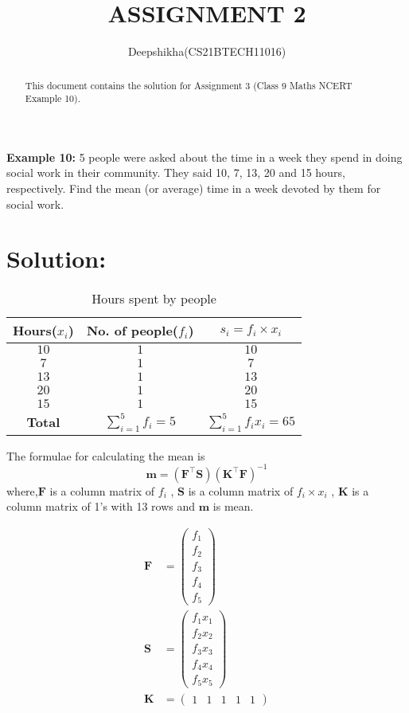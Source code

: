 \documentclass[journal, 12pt, twocolumn]{IEEEtran}
\let\vec\mathbf
\newcommand{\myvec}[1]{\ensuremath{\begin{pmatrix}#1\end{pmatrix}}}
\providecommand{\brak}[1]{\ensuremath{\left(#1\right)}}
\begin{document}
\title{ASSIGNMENT 2}
\author{Deepshikha(CS21BTECH11016)}
\maketitle

\begin{abstract}
This document contains the solution for Assignment 3 (Class 9 Maths NCERT Example 10).
\end{abstract}

\textbf{Example 10:}
5 people were asked about the time in a week they spend in doing
social work in their community. They said 10, 7, 13, 20 and 15 hours, respectively.
Find the mean (or average) time in a week devoted by them for social work.

\section*{\textbf{Solution:}}
\begin{table}[!ht]
    \centering
    \begin{tabular}{|c|c|c|}
    \hline
     Hours($x_{i}$) & No. of people($f_{i}$) & $ s_{i} = f_{i}\times x_{i}$\\
     \hline
     $10$ & $1$ & $10$\\
     $7$  & $1$ & $7$\\
     $13$ & $1$ & $13$\\
     $20$ & $1$ & $20$\\
     $15$ & $1$ & $15$\\
     \hline
    \textbf{Total} & $\sum_{i=1}^{5} f_{i} = 5$ & $\sum_{i=1}^{5} f_{i}x_{i} = 65$ \\
    \hline
    \end{tabular}
    \caption{Hours spent by people}
    \label{table:Table 1}
\end{table}
The formulae for calculating the mean is 
\begin{equation}
\label{eq:formulae}
    \vec{m} = \brak{\vec{F^{\top}}\vec{S}}\brak{\vec{K^{\top}}\vec{F}}^{-1}
\end{equation}
where,$\vec{F}$ is a column matrix of $f_{i}$ , $\vec{S}$ is a column matrix of $f_{i}\times x_{i}$ , $\vec{K}$ is a column matrix of 1's with 13 rows and $\vec{m}$ is mean.


\begin{align}
    	 \label{eq:formulae2}
	      	\vec{F}&=\myvec{f_{1}\\f_{2}\\f_{3}\\f_{4}\\f_{5}}\\
	     \label{eq:formulae3}
	      	\vec{S}&=\myvec{f_{1}x_{1}\\f_{2}x_{2}\\f_{3}x_{3}\\f_{4}x_{4}\\f_{5}x_{5}}\\
	     \label{eq:formulae4}
      		\vec{K}&=\myvec{1 & 1 & 1 & 1 & 1}
    \end{align}
    
\end{document}
